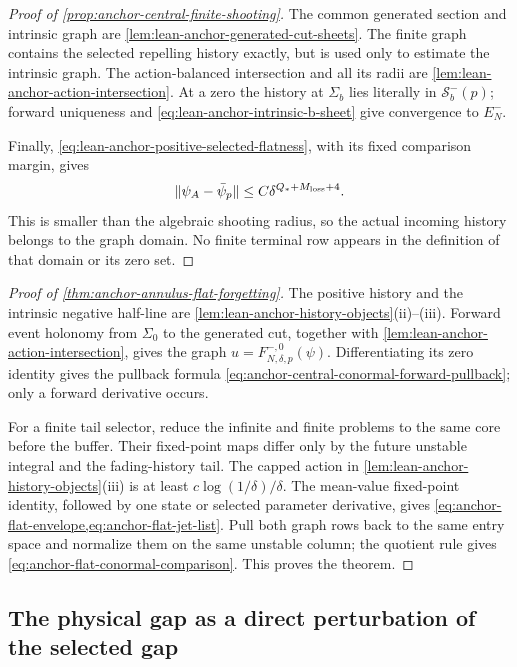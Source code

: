 \begin{proof}[Proof of \cref{prop:anchor-central-finite-shooting}]
The common generated section and intrinsic graph are
\cref{lem:lean-anchor-generated-cut-sheets}.  The finite graph contains the
selected repelling history exactly, but is used only to estimate the
intrinsic graph.  The action-balanced intersection and all its radii are
\cref{lem:lean-anchor-action-intersection}.  At a zero the history at
\(\Sigma_b\) lies literally in \(\mathcal S_b^-(p)\); forward uniqueness
and \cref{eq:lean-anchor-intrinsic-b-sheet} give convergence to \(E_N^-\).

Finally, \cref{eq:lean-anchor-positive-selected-flatness}, with its
fixed comparison margin, gives
\[
 \|\psi_A-\bar\psi_p\|
 \le C\delta^{Q_*+M_{\rm loss}+4}.
\]
This is smaller than the algebraic shooting radius, so the actual incoming
history belongs to the graph domain.  No finite terminal row appears in
the definition of that domain or its zero set.
\end{proof}

\begin{proof}[Proof of \cref{thm:anchor-annulus-flat-forgetting}]
The positive history and the intrinsic negative half-line are
\cref{lem:lean-anchor-history-objects}(ii)--(iii).  Forward event holonomy
from \(\Sigma_0\) to the generated cut, together with
\cref{lem:lean-anchor-action-intersection}, gives the graph
\(u=F_{N,\delta,p}^{-,0}(\psi)\).  Differentiating its zero identity gives
the pullback formula
\cref{eq:anchor-central-conormal-forward-pullback}; only a forward
derivative occurs.

For a finite tail selector, reduce the infinite and finite problems to the
same core before the buffer.  Their fixed-point maps differ only by the
future unstable integral and the fading-history tail.  The capped action in
\cref{lem:lean-anchor-history-objects}(iii) is at least
\(c\log(1/\delta)/\delta\).  The mean-value fixed-point identity, followed
by one state or selected parameter derivative, gives
\cref{eq:anchor-flat-envelope,eq:anchor-flat-jet-list}.  Pull both graph rows
back to the same entry space and normalize them on the same unstable column;
the quotient rule gives
\cref{eq:anchor-flat-conormal-comparison}.  This proves the theorem.
\end{proof}

\subsection{The physical gap as a direct perturbation of the selected gap}

